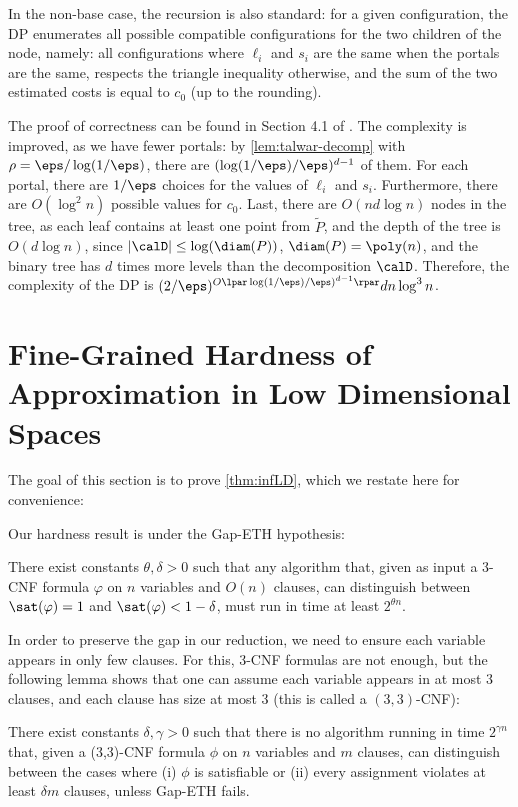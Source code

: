 In the non-base case, the recursion is also standard: for a given configuration, 
the DP enumerates all possible compatible configurations for the two children of the node, namely: all configurations where $\ell_i$ and $s_i$ are the same when the portals are the same, respects the triangle inequality otherwise, and the sum of the two estimated costs is equal to $c_0$ (up to the rounding).

The proof of correctness can be found in Section 4.1 of \cite{jacm}. The complexity is improved, as we have fewer portals: by \cref{lem:talwar-decomp} with $\rho = \eps/\log(1/\eps)$, there are $(\log(1/\eps) / \eps)^{d-1}$ of them. For each portal, there are $1/\eps$ choices for the values of $\ell_i$ and $s_i$. Furthermore, there are $O(\log^2 n)$ possible values for $c_0$. 
Last, there are $O(nd \log n)$ nodes in the tree, as each leaf contains at least one point from $\tilde P$, and the depth of the tree is $O(d \log n)$, since $|\calD| \leq \log(\diam(P))$, $\diam(P) = \poly(n)$, and the binary tree has $d$ times more levels than the decomposition $\calD$. 
Therefore, the complexity of the DP is $(2/\eps)^{O\lpar \log(1/\eps)/\eps)^{d-1}\rpar} dn \log^3 n$. 

\section{Fine-Grained Hardness of Approximation in Low Dimensional Spaces}\label{sec:infLD}

The goal of this section is to prove \cref{thm:infLD}, which we restate here for convenience:
\infLD*

Our hardness result is under the Gap-ETH hypothesis:

\begin{definition} \label{hyp:gap-eth}
There exist constants $\theta,\delta> 0$ such that any algorithm that, given as input a 3-CNF formula $\varphi$ on $n$ variables and $O(n)$ clauses, can distinguish between $\sat(\varphi)=1$ and $\sat(\varphi)<1-\delta$, must run in time at least $2^{\theta n}$.
\end{definition}

In order to preserve the gap in our reduction, we need to ensure each variable appears in only few clauses. For this, 3-CNF formulas are not enough, but the following lemma shows that one can assume each variable appears in at most $3$ clauses, and each clause has size at most 3 (this is called a $(3, 3)$-CNF):
\begin{lemma}\label{lem:gap-eth}
    There exist constants $\delta, \gamma > 0$ such that there is no algorithm running in time $2^{\gamma n}$ that, given a
(3,3)-CNF formula $\phi$ on $n$ variables and $m$ clauses, can distinguish between the cases where (i) $\phi$
is satisfiable or (ii) every assignment violates at least $\delta m$ clauses, unless Gap-ETH fails.
\end{lemma}

